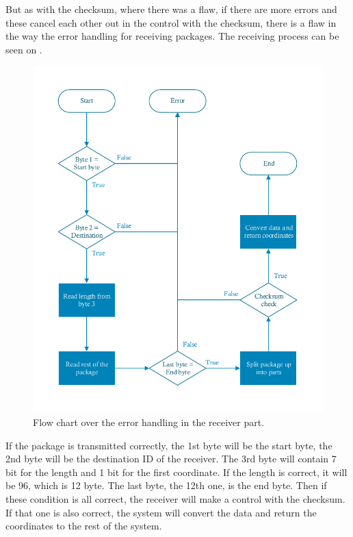 But as with the checksum, where there was a flaw, if there are more errors and these cancel each other out in the control with the checksum, there is a flaw in the way the error handling for receiving packages. The receiving process can be seen on .

\begin{figure}[H]
\centering
\includegraphics[scale=0.7]{figures/FlowReceiver.pdf}
\caption{Flow chart over the error handling in the receiver part.}
\label{FlowReceiver}
\end{figure}

If the package is transmitted correctly, the 1st byte will be the start byte, the 2nd byte will be the destination ID of the receiver. The 3rd byte will contain 7 bit for the length and 1 bit for the first coordinate. If the length is correct, it will be 96, which is 12 byte. The last byte, the 12th one, is the end byte. Then if these condition is all correct, the receiver will make a control with the checksum. If that one is also correct, the system will convert the data and return the coordinates to the rest of the system.

